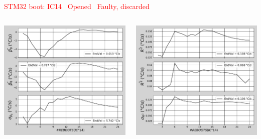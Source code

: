 \begin{frame}{\textcolor{red}{STM32 boot: IC14 \textrightarrow\ Opened \textrightarrow\ Faulty, discarded}}
	\vspace{5mm}
	\begin{columns}
		\begin{column}{0.5\textwidth}
			\includegraphics[width=1.0\textwidth]{./figures/flistCircuit14_25_sl30beta0.pdf}
		\end{column}
		\begin{column}{0.5\textwidth}
			\includegraphics[width=1.0\textwidth]{./figures/flistCircuit14_25_sl30r2.pdf}
		\end{column}
	\end{columns}
\end{frame}

